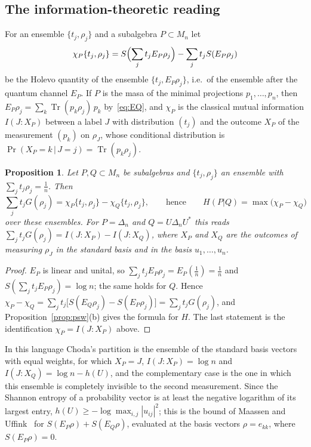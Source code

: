 \documentclass[11pt]{article}
\DeclareMathOperator{\Tr}{Tr}
\theoremstyle{plain}
\newtheorem{proposition}[theorem]{Proposition}
\theoremstyle{definition}
\theoremstyle{remark}
\begin{document}
\subsection{The information-theoretic reading}

For an ensemble $\{t_j,\rho_j\}$ and a subalgebra $P\subset M_n$ let
\[
  \chi_P\{t_j,\rho_j\}=S\Bigl(\sum_jt_jE_P\rho_j\Bigr)-\sum_jt_jS(E_P\rho_j)
\]
be the Holevo quantity of the ensemble $\{t_j,E_P\rho_j\}$, i.e.\ of the ensemble after the quantum channel $E_P$. If $P$ is
the masa of the minimal projections $p_1,\dots,p_n$, then $E_P\rho_j=\sum_k\Tr(p_k\rho_j)\,p_k$ by~\eqref{eq:EQ}, and
$\chi_P$ is the classical mutual information $I(J:X_P)$ between a label $J$ with distribution $(t_j)$ and the outcome $X_P$
of the measurement $(p_k)$ on $\rho_J$, whose conditional distribution is $\Pr(X_P=k\,|\,J=j)=\Tr(p_k\rho_j)$.

\begin{proposition}\label{prop:info}
Let $P,Q\subset M_n$ be subalgebras and $\{t_j,\rho_j\}$ an ensemble with $\sum_jt_j\rho_j=\frac1n$. Then
\[
  \sum_jt_jG(\rho_j)=\chi_P\{t_j,\rho_j\}-\chi_Q\{t_j,\rho_j\},
  \qquad\text{hence}\qquad H(P|Q)=\max\bigl(\chi_P-\chi_Q\bigr)
\]
over these ensembles. For $P=\Delta_n$ and $Q=U\Delta_nU^*$ this reads $\sum_jt_jG(\rho_j)=I(J:X_P)-I(J:X_Q)$, where $X_P$ and
$X_Q$ are the outcomes of measuring $\rho_J$ in the standard basis and in the basis $u_1,\dots,u_n$.
\end{proposition}
\begin{proof}
$E_P$ is linear and unital, so $\sum_jt_jE_P\rho_j=E_P(\frac1n)=\frac1n$ and $S(\sum_jt_jE_P\rho_j)=\log n$; the same holds for
$Q$. Hence $\chi_P-\chi_Q=\sum_jt_j\bigl[S(E_Q\rho_j)-S(E_P\rho_j)\bigr]=\sum_jt_jG(\rho_j)$, and Proposition~\ref{prop:psw}(b)
gives the formula for $H$. The last statement is the identification $\chi_P=I(J:X_P)$ above.
\end{proof}

In this language Choda's partition is the ensemble of the standard basis vectors with equal weights, for which $X_P=J$,
$I(J:X_P)=\log n$ and $I(J:X_Q)=\log n-h(U)$, and the complementary case is the one in which this ensemble is completely
invisible to the second measurement. Since the Shannon entropy of a probability vector is at least the negative logarithm
of its largest entry, $h(U)\ge-\log\max_{i,j}|u_{ij}|^2$; this is the bound of Maassen and Uffink~\cite{maassen1988} for
$S(E_P\rho)+S(E_Q\rho)$, evaluated at the basis vectors $\rho=e_{kk}$, where $S(E_P\rho)=0$.
\end{document}
